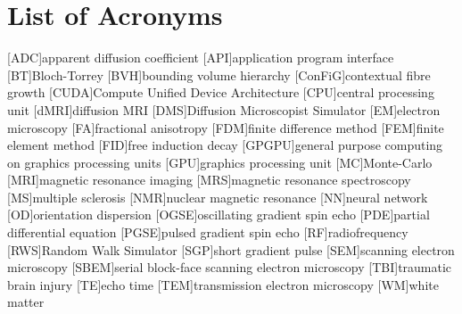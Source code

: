 
\chapter*{List of Acronyms}

\makeatletter
\patchcmd{\AC@@acro}{] #3}{] \MakeUppercase #3}{}{}
\patchcmd{\AC@@acro}{] #3}{] \MakeUppercase #3}{}{}
\makeatother
\begin{acronym}
  [ADC]{apparent diffusion coefficient}
  [API]{application program interface}
  [BT]{Bloch-Torrey}
  [BVH]{bounding volume hierarchy}
  [ConFiG]{contextual fibre growth}
  [CUDA]{Compute Unified Device Architecture}
  [CPU]{central processing unit}
  [dMRI]{diffusion MRI}
  [DMS]{Diffusion Microscopist Simulator}
  [EM]{electron microscopy}
  [FA]{fractional anisotropy}
  [FDM]{finite difference method}
  [FEM]{finite element method}
  [FID]{free induction decay}
  [GPGPU]{general purpose computing on graphics processing units}
  [GPU]{graphics processing unit}
  [MC]{Monte-Carlo}
  [MRI]{magnetic resonance imaging}
  [MRS]{magnetic resonance spectroscopy}
  [MS]{multiple sclerosis}
  [NMR]{nuclear magnetic resonance}
  [NN]{neural network}
  [OD]{orientation dispersion}
  [OGSE]{oscillating gradient spin echo}
  [PDE]{partial differential equation}
  [PGSE]{pulsed gradient spin echo}
  [RF]{radiofrequency}
  [RWS]{Random Walk Simulator}
  [SGP]{short gradient pulse}
  [SEM]{scanning electron microscopy}
  [SBEM]{serial block-face scanning electron microscopy}
  [TBI]{traumatic brain injury}
  [TE]{echo time}
  [TEM]{transmission electron microscopy}
  [WM]{white matter}
\end{acronym}



